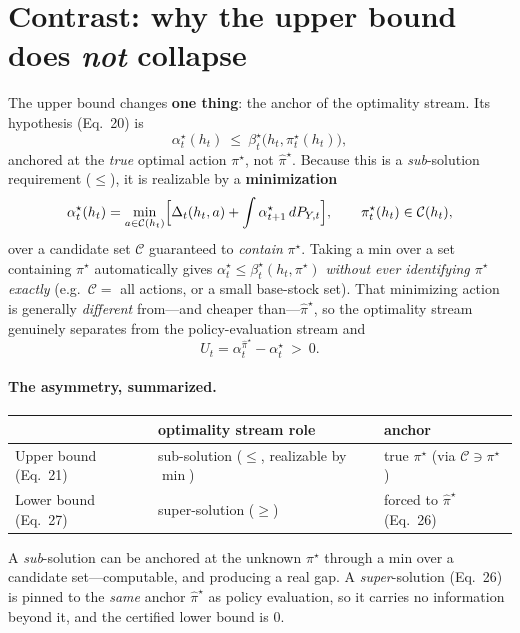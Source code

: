 \documentclass[11pt]{article}
\newcommand{\pihat}{\hat\pi}
\newcommand{\PY}{P_{Y,t}}
\theoremstyle{definition}
\begin{document}
\section{Contrast: why the upper bound does \emph{not} collapse}
The upper bound changes \textbf{one thing}: the anchor of the optimality stream.
Its hypothesis (Eq.~20) is
\begin{equation}
\alpha^{\star}_t(h_t)\ \le\ \beta^{\star}_t\bigl(h_t,\pi^\star_t(h_t)\bigr),
\tag{20}
\end{equation}
anchored at the \emph{true} optimal action $\pi^\star$, not $\pihat^\star$. Because
this is a \emph{sub}-solution requirement ($\le$), it is realizable by a
\textbf{minimization}
\begin{equation}
\alpha^{\star}_t(h_t)=\min_{a\in\mathcal C(h_t)}\Bigl[\Delta_t(h_t,a)+\int \alpha^{\star}_{t+1}\,d\PY\Bigr],
\qquad \pi^\star_t(h_t)\in\mathcal C(h_t),
\end{equation}
over a candidate set $\mathcal C$ guaranteed to \emph{contain} $\pi^\star$. Taking a
min over a set containing $\pi^\star$ automatically gives
$\alpha^\star_t\le\beta^\star_t(h_t,\pi^\star)$ \emph{without ever identifying
$\pi^\star$ exactly} (e.g.\ $\mathcal C=$ all actions, or a small base-stock set).
That minimizing action is generally \emph{different} from---and cheaper
than---$\pihat^\star$, so the optimality stream genuinely separates from the
policy-evaluation stream and
\[
U_t=\alpha^{\pihat^\star}_t-\alpha^{\star}_t\ >\ 0 .
\]

\paragraph{The asymmetry, summarized.}
\begin{center}
\begin{tabular}{lll}
\hline
 & optimality stream role & anchor \\
\hline
Upper bound (Eq.~21) & sub-solution ($\le$, realizable by $\min$) & true $\pi^\star$ (via $\mathcal C\ni\pi^\star$) \\
Lower bound (Eq.~27) & super-solution ($\ge$) & forced to $\pihat^\star$ (Eq.~26) \\
\hline
\end{tabular}
\end{center}
A \emph{sub}-solution can be anchored at the unknown $\pi^\star$ through a min over
a candidate set---computable, and producing a real gap. A \emph{super}-solution
(Eq.~26) is pinned to the \emph{same} anchor $\pihat^\star$ as policy evaluation, so
it carries no information beyond it, and the certified lower bound is $0$.
\end{document}
